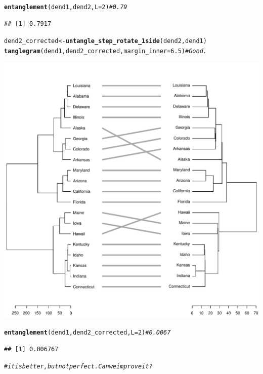 \documentclass[shortnames,nojss,article]{jss}\usepackage[]{graphicx}\usepackage[]{color}
\makeatletter
\def\maxwidth{ %
  \ifdim\Gin@nat@width>\linewidth
    \linewidth
  \else
    \Gin@nat@width
  \fi
}
\newcommand{\hlnum}[1]{\textcolor[rgb]{0.686,0.059,0.569}{#1}}%
\newcommand{\hlcom}[1]{\textcolor[rgb]{0.678,0.584,0.686}{\textit{#1}}}%
\newcommand{\hlstd}[1]{\textcolor[rgb]{0.345,0.345,0.345}{#1}}%
\newcommand{\hlkwb}[1]{\textcolor[rgb]{0.69,0.353,0.396}{#1}}%
\newcommand{\hlkwc}[1]{\textcolor[rgb]{0.333,0.667,0.333}{#1}}%
\newcommand{\hlkwd}[1]{\textcolor[rgb]{0.737,0.353,0.396}{\textbf{#1}}}%
\newenvironment{kframe}{%
 \def\at@end@of@kframe{}%
 \ifinner\ifhmode%
  \def\at@end@of@kframe{\end{minipage}}%
  \begin{minipage}{\columnwidth}%
 \fi\fi%
 \def\FrameCommand##1{\hskip\@totalleftmargin \hskip-\fboxsep
 \colorbox{shadecolor}{##1}\hskip-\fboxsep
     \hskip-\linewidth \hskip-\@totalleftmargin \hskip\columnwidth}%
 \MakeFramed {\advance\hsize-\width
   \@totalleftmargin\z@ \linewidth\hsize
   \@setminipage}}%
 {\par\unskip\endMakeFramed%
 \at@end@of@kframe}
\newenvironment{knitrout}{}{} %
\makeatother
\begin{document}
\begin{knitrout}
{}


\begin{kframe}\begin{alltt}
\hlkwd{entanglement}\hlstd{(dend1, dend2,} \hlkwc{L} \hlstd{=} \hlnum{2}\hlstd{)}  \hlcom{# 0.79}
\end{alltt}
\begin{verbatim}
## [1] 0.7917
\end{verbatim}
\begin{alltt}
\hlstd{dend2_corrected} \hlkwb{<-} \hlkwd{untangle_step_rotate_1side}\hlstd{(dend2, dend1)}
\hlkwd{tanglegram}\hlstd{(dend1, dend2_corrected,} \hlkwc{margin_inner} \hlstd{=} \hlnum{6.5}\hlstd{)}  \hlcom{# Good.}
\end{alltt}
\end{kframe}

{\centering \includegraphics[width=\maxwidth]{figure/untangle_step_rotate_2side_example2} 

}


\begin{kframe}\begin{alltt}
\hlkwd{entanglement}\hlstd{(dend1, dend2_corrected,} \hlkwc{L} \hlstd{=} \hlnum{2}\hlstd{)}  \hlcom{# 0.0067}
\end{alltt}
\begin{verbatim}
## [1] 0.006767
\end{verbatim}
\begin{alltt}
\hlcom{# it is better, but not perfect. Can we improve it?}


\end{alltt}
\end{kframe}
\end{knitrout}
\end{document}
